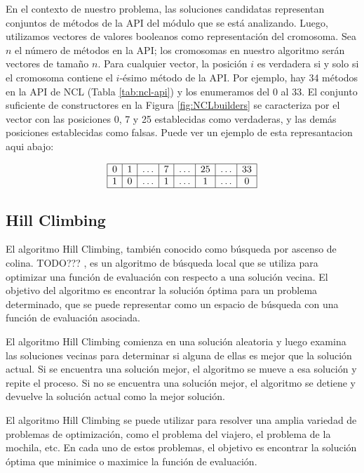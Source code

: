 En el contexto de nuestro problema, las soluciones candidatas representan conjuntos de métodos de la API del módulo que se está analizando. Luego, utilizamos vectores de valores booleanos como representación del cromosoma. Sea $n$ el número de métodos en la API; los cromosomas en nuestro algoritmo serán vectores de tamaño $n$. Para cualquier vector, la posición $i$ es verdadera si y solo si el cromosoma contiene el $i$-ésimo método de la API. Por ejemplo, hay 34 métodos en la API de NCL (Tabla \ref{tab:ncl-api}) y los enumeramos del 0 al 33. El conjunto suficiente de constructores en la Figura \ref{fig:NCLbuilders} se caracteriza por el vector con las posiciones 0, 7 y 25 establecidas como verdaderas, y las demás posiciones establecidas como falsas. Puede ver un ejemplo de esta represantacion aqui abajo:

\[
\begin{array}{|*{8}{c|}}
\hline
0 & 1 & \ldots  & 7 & \ldots  & 25  & \ldots  & 33 \\
\hline
1 & 0 & \ldots  & 1 & \ldots  & 1  & \ldots  & 0 \\
\hline
\end{array}
\]



\subsection{Hill Climbing}
\label{alg:approachHC}
El algoritmo Hill Climbing, también conocido como búsqueda por ascenso de colina. TODO??? , es un algoritmo de búsqueda local que se utiliza para optimizar una función de evaluación con respecto a una solución vecina. El objetivo del algoritmo es encontrar la solución óptima para un problema determinado, que se puede representar como un espacio de búsqueda con una función de evaluación asociada.

El algoritmo Hill Climbing comienza en una solución aleatoria y luego examina las soluciones vecinas para determinar si alguna de ellas es mejor que la solución actual. Si se encuentra una solución mejor, el algoritmo se mueve a esa solución y repite el proceso. Si no se encuentra una solución mejor, el algoritmo se detiene y devuelve la solución actual como la mejor solución.

El algoritmo Hill Climbing se puede utilizar para resolver una amplia variedad de problemas de optimización, como el problema del viajero, el problema de la mochila, etc. En cada uno de estos problemas, el objetivo es encontrar la solución óptima que minimice o maximice la función de evaluación.


